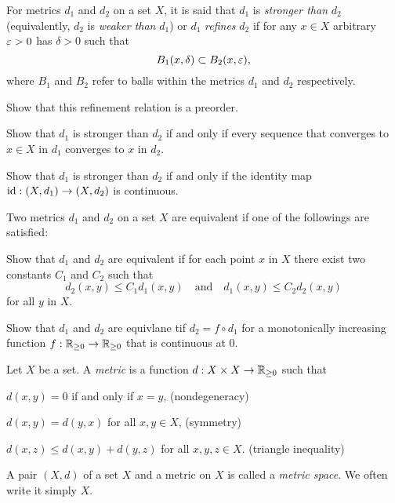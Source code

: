 \documentclass{../note}
\begin{document}
\begin{prb}
For metrics $d_1$ and $d_2$ on a set $X$, it is said that $d_1$ is \emph{stronger than} $d_2$ (equivalently, $d_2$ is \emph{weaker than} $d_1$) or $d_1$ \emph{refines} $d_2$ if for any $x\in X$ arbitrary $\varepsilon>0$ has $\delta>0$ such that
\[B_1(x,\delta)\subset B_2(x,\varepsilon),\]
where $B_1$ and $B_2$ refer to balls within the metrics $d_1$ and $d_2$ respectively.
\begin{parts}
\item
Show that this refinement relation is a preorder.
\item
Show that $d_1$ is stronger than $d_2$ if and only if every sequence that converges to $x\in X$ in $d_1$ converges to $x$ in $d_2$.
\item
Show that $d_1$ is stronger than $d_2$ if and only if the identity map $\operatorname{id}:(X,d_1)\to(X,d_2)$ is continuous.
\end{parts}
\end{prb}

\begin{prb}
Two metrics $d_1$ and $d_2$ on a set $X$ are equivalent if one of the followings are satisfied:
\begin{parts}
\item
Show that $d_1$ and $d_2$ are equivalent if for each point $x$ in $X$ there exist two constants $C_1$ and $C_2$ such that
\[d_2(x,y)\le C_1d_1(x,y)\quad\text{and}\quad d_1(x,y)\le C_2d_2(x,y)\]
for all $y$ in $X$.
\item
Show that $d_1$ and $d_2$ are equivlane tif $d_2=f\circ d_1$ for a monotonically increasing function $f:\mathbb{R}_{\ge0}\to\mathbb{R}_{\ge0}$ that is continuous at $0$.
\end{parts}
\end{prb}


\begin{defn}
Let $X$ be a set.
A \emph{metric} is a function $d:X\times X\to\mathbb{R}_{\ge0}$ such that
\begin{parts}
\item $d(x,y)=0$ if and only if $x=y$, \hfill(nondegeneracy)
\item $d(x,y)=d(y,x)$ for all $x,y\in X$, \hfill(symmetry)
\item $d(x,z)\le d(x,y)+d(y,z)$ for all $x,y,z\in X$. \hfill(triangle inequality)
\end{parts}
A pair $(X,d)$ of a set $X$ and a metric on $X$ is called a \emph{metric space}.
We often write it simply $X$.
\end{defn}
\end{document}
